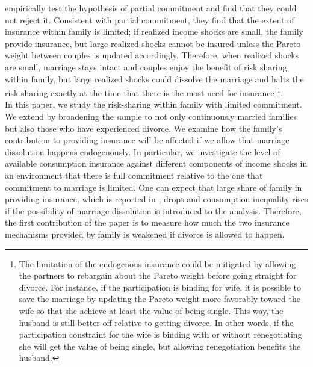 \citet{Lise_Yamada_2014} empirically test the hypothesis of partial commitment and find that they could not reject it. Consistent with partial commitment, they find that the extent of insurance within family is limited; if realized income shocks are small, the family provide insurance, but large realized shocks cannot be insured unless the Pareto weight between couples is updated accordingly. Therefore, when realized shocks are small, marriage stays intact and couples enjoy the benefit of risk sharing within family, but large realized shocks could dissolve the marriage and halts the risk sharing exactly at the time that there is the most need for insurance \footnote{ The limitation of the endogenous insurance could be mitigated by allowing the partners to rebargain about the Pareto weight before going straight for divorce. For instance, if the participation is binding for wife, it is possible to save the marriage by updating the Pareto weight more favorably toward the wife so that she achieve at least the value of being single. This way, the husband is still better off relative to getting divorce. In other words, if the participation constraint for the wife is binding with or without renegotiating she will get the value of being single, but allowing renegotiation benefits the husband.}.\\

In this paper, we study the risk-sharing within family with limited commitment. We extend \citet{Blundell_etal_2015_Con-Ineq}  by broadening the sample to not only continuously married families but also those who have experienced divorce. We examine how the family's contribution to providing insurance will be affected if we allow that marriage dissolution happens endogenously. In particular, we investigate the level of available consumption insurance against different components of income shocks in an environment that there is full commitment relative to the one that commitment to marriage is limited. One can expect that large share of family in providing insurance, which is reported in \citet{Blundell_etal_2015_Con-Ineq}, drops and consumption inequality rises if the possibility of marriage dissolution is introduced to the analysis. Therefore, the first contribution of the paper is to measure how much the two insurance mechanisms provided by family is weakened if divorce is allowed to happen. \\

